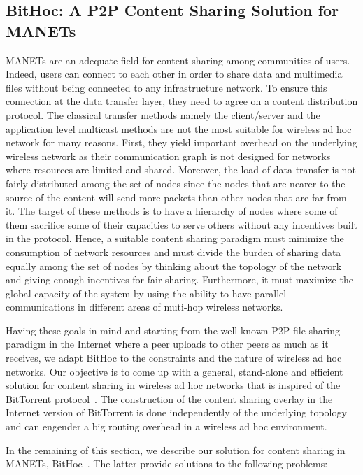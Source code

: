 \subsection{BitHoc: A P2P Content Sharing Solution for MANETs}

MANETs are an adequate field for content sharing among communities of users. Indeed, users can connect to each other in order to share data and multimedia files without being connected to any infrastructure network. To ensure this connection at the data transfer layer, they need to agree on a content distribution protocol. The classical transfer methods namely the client/server and the application level multicast methods are not the most suitable for wireless ad hoc network for many reasons. First, they yield important overhead on the underlying wireless network as their communication graph is not designed for networks where resources are limited and shared. Moreover, the load of data transfer is not fairly distributed among the set of nodes since the nodes that are nearer to the source of the content will send more packets than other nodes that are far from it. The target of these methods is to have a hierarchy of nodes where some of them sacrifice some of their capacities to serve others without any incentives built in the protocol. 
Hence, a suitable content sharing paradigm must minimize the consumption of network resources and must divide the burden of sharing data equally among the set of nodes by thinking about the topology of the network and giving enough incentives for fair sharing. Furthermore, it must maximize the global capacity of the system by using the ability to have parallel communications in different areas of muti-hop wireless networks.

Having these goals in mind and starting from the well known P2P file sharing paradigm in the Internet where a peer uploads to other peers as much as it receives, we adapt BitHoc to the constraints and the nature of wireless ad hoc networks. Our objective is to come up with a general, stand-alone and efficient solution for content sharing in wireless ad hoc networks that is inspired of the BitTorrent protocol~\cite{RefBT}. The construction of the content sharing overlay in the Internet version of BitTorrent is done independently of the underlying topology and can engender a big routing overhead in a wireless ad hoc environment.

In the remaining of this section, we describe our solution for content sharing in MANETs, BitHoc~\cite{BitHoc, BitHocWeb}. The latter provide solutions to the following problems:

